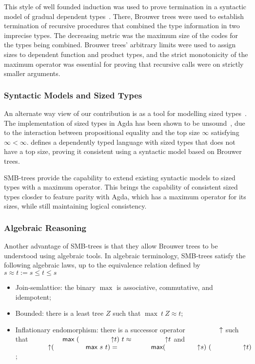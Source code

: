 This style of well founded induction was used to prove termination
in a syntactic model of gradual dependent types~\citep{Eremondi_2023}. There, Brouwer trees
were used to establish termination of recursive procedures that
combined the type information in two imprecise types.
The decreasing metric was the maximum size of the codes for the types being combined. Brouwer trees' arbitrary limits were used to assign sizes
to dependent function and product types, and the strict monotonicity of the
maximum operator was essential for proving that recursive calls were on
strictly smaller arguments.

\subsubsection{Syntactic Models and Sized Types}

An alternate way view of our contribution is as a tool for modelling sized types~\citep{10.1145/237721.240882}.
The implementation of sized types in Agda has been shown to be unsound~\citep{agdaSizedIssue}, due to the interaction
between propositional equality and the top size $\infty$ satisfying $\infty < \infty$.
 defines a dependently typed language with sized types that does not have a top size, proving it consistent
using a syntactic model based on Brouwer trees.

SMB-trees provide the capability to extend existing syntactic models to sized types
with a maximum operator.
This brings the capability of consistent sized types closder to feature parity with Agda,
which has a maximum operator for its sizes,
while still maintaining logical consistency.

\subsubsection{Algebraic Reasoning}
Another advantage of SMB-trees is that they allow Brouwer trees to
be understood using algebraic tools.
In algebraic terminology, SMB-trees satisfy the following algebraic laws, up to the equivalence relation defined by $s \approx t := s \le t \le s $
\begin{itemize}
  \item Join-semlattice: the binary $\max$ is associative, commutative, and idempotent;
  \item Bounded: there is a least tree $Z$ such that $\max\ t\ Z \approx t$;
  \item Inflationary endomorphism: there is a successor operator $\up$
        such that ${\max\ (\up t)\ t \approx \up t}$
        and\\ ${\up (\max\ s\ t) = \max (\up s)\ (\up t)}$;
\end{itemize}

